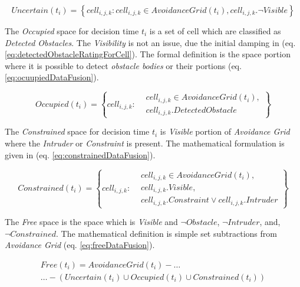 \begin{equation}\label{eq:UncertainDataFusion}
    Uncertain(t_i) = \left\{cell_{i,j,k}:cell_{i,j,k}\in AvoidanceGrid(t_i),cell_{i,j,k}.\neg Visible \right\}
\end{equation}

\noindent The \emph{Occupied} space for decision time $t_i$ is a set of cell which are classified as \emph{Detected Obstacles}. The \emph{Visibility} is not an issue, due the initial damping in (eq. \ref{eq:detectedObstacleRatingForCell}). The formal definition is the space portion where it is possible to detect \emph{obstacle bodies} or their portions (eq. \ref{eq:ocuupiedDataFusion}).

\begin{equation}\label{eq:ocuupiedDataFusion}
    Occupied(t_i) = \left\{cell_{i,j,k}:\begin{aligned}&cell_{i,j,k}\in AvoidanceGrid(t_i),\\&cell_{i,j,k}.DetectedObstacle\end{aligned}\right\}
\end{equation}

\noindent The \emph{Constrained} space for decision time $t_i$ is \emph{Visible} portion of \emph{Avoidance Grid} where the \emph{Intruder} or \emph{Constraint} is present. The mathematical formulation is given in (eq. \ref{eq:constrainedDataFusion}).

\begin{equation}\label{eq:constrainedDataFusion}
    Constrained(t_i) = \left\{cell_{i,j,k}:
    \begin{aligned}
        &cell_{i,j,k} \in AvoidanceGrid(t_i),\\
        &cell_{i,j,k}.Visible,\\
        &cell_{i,j,k}.Constraint \vee cell_{i,j,k}.Intruder
    \end{aligned}\right\}
\end{equation}

\noindent The \emph{Free} space is the space which is \emph{Visible} and $\neg Obstacle$,  $\neg Intruder$, and, $\neg Constrained$. The mathematical definition is simple set subtractions from \emph{Avoidance Grid} (eq. \ref{eq:freeDataFusion}).

\begin{multline}\label{eq:freeDataFusion}
    Free(t_i) = AvoidanceGrid(t_i) -\dots\\\dots -\left(Uncertain(t_i)\cup Occupied(t_i)\cup  Constrained(t_i)\right)
\end{multline}

